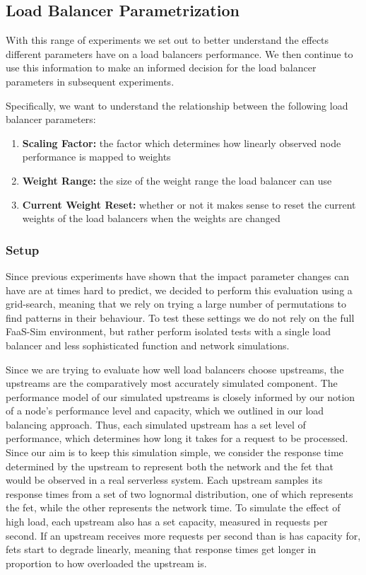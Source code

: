 \documentclass[draft,final]{vutinfth} %
\begin{document}
\subsection{Load Balancer Parametrization}
With this range of experiments we set out to better understand the effects different parameters have on a load balancers performance.
We then continue to use this information to make an informed decision for the load balancer parameters in subsequent experiments.

Specifically, we want to understand the relationship between the following load balancer parameters:
\begin{enumerate}
    \item \textbf{Scaling Factor:} the factor which determines how linearly observed node performance is mapped to weights
    \item \textbf{Weight Range:} the size of the weight range the load balancer can use
    \item \textbf{Current Weight Reset:} whether or not it makes sense to reset the current weights of the load balancers when the weights are changed
\end{enumerate}

\subsubsection{Setup}

Since previous experiments have shown that the impact parameter changes can have are at times hard to predict, we decided to perform this evaluation using a grid-search, meaning that we rely on trying a large number of permutations to find patterns in their behaviour.
To test these settings we do not rely on the full FaaS-Sim environment, but rather perform isolated tests with a single load balancer and less sophisticated function and network simulations.

Since we are trying to evaluate how well load balancers choose upstreams, the upstreams are the comparatively most accurately simulated component.
The performance model of our simulated upstreams is closely informed by our notion of a node's performance level and capacity, which we outlined in our load balancing approach.
Thus, each simulated upstream has a set level of performance, which determines how long it takes for a request to be processed.
Since our aim is to keep this simulation simple, we consider the response time determined by the upstream to represent both the network and the \gls{fet} that would be observed in a real serverless system.
Each upstream samples its response times from a set of two lognormal distribution, one of which represents the \gls{fet}, while the other represents the network time.
To simulate the effect of high load, each upstream also has a set capacity, measured in requests per second.
If an upstream receives more requests per second than is has capacity for, \glspl{fet} start to degrade linearly, meaning that response times get longer in proportion to how overloaded the upstream is.
\end{document}
